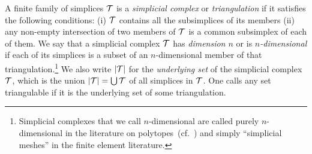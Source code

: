 \documentclass[10pt,a4paper]{article}
\begin{document}
A finite family of simplices ${\mathcal T}$ is a \emph{simplicial complex} or \emph{triangulation} if it satisfies the following conditions: 
(i) ${\mathcal T}$ contains all the subsimplices of its members (ii) any non-empty intersection of two members of ${\mathcal T}$ is a common subsimplex of each of them. 
We say that a simplicial complex ${\mathcal T}$ has \emph{dimension $n$} or is \emph{$n$-dimensional} if each of its simplices is a subset of an $n$-dimensional member of that triangulation.\footnote{Simplicial complexes that we call $n$-dimensional are called purely $n$-dimensional in the literature on polytopes~(cf.~\cite{ziegler1995lectures}) and simply ``simplicial meshes'' in the finite element literature.} 
We also write $\left| {\mathcal T} \right|$ for the \emph{underlying set} of the simplicial complex ${\mathcal T}$, 
which is the union $\left| {\mathcal T} \right| = \bigcup {\mathcal T}$ of all simplices in ${\mathcal T}$.
One calls any set triangulable if it is the underlying set of some triangulation. 


\begin{comment}
\begin{remark}
    Our main interest in this manuscript are finite triangulations of compact sets. 
    There is another reason why we insist on the triangulation being finite: 
    if we do not require our simplicial complexes to be finite,
    then a reasonable definition of simplicial complex would need additional topological conditions. 
    For example, if we modify our definition of simplicial complex to be infinite, 
    then any subset of Euclidean space would give rise to an ``infinite $0$-dimensional complex''. But this obviously does not reflect the topology. 
    A more interesting such example is this:
    the Cantor set $\calC \subseteq [0,1]$ is a compact set 
    that underlies an ``infinite $0$-dimensional simplicial complex''.
    If we place $\calC$ on the x-axis of a 2D coordinate system 
    and connect each member of $\calC$ to $(0,1) \in \bbR^{2}$ via a straight line segment, 
    then the resulting set is still compact, even path-connected,  
    but has an ``infinite $1$-dimensional triangulation''.
    However, none of these infinite families are infinite simplicial complexes in the sense of geometric topology~\cite{lee2011topological}. 
\end{remark}
\end{comment}
\end{document}
